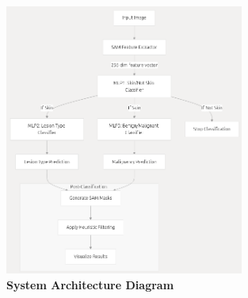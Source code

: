 \documentclass[10pt,a4paper]{article}
\begin{document}
\vspace{2em}
\begin{figure}[htb!]
    \centering
    \includegraphics[width=0.7\textwidth]{pipeline.png}
    \caption{\textbf{System Architecture Diagram}}
\end{figure}



\end{document}
